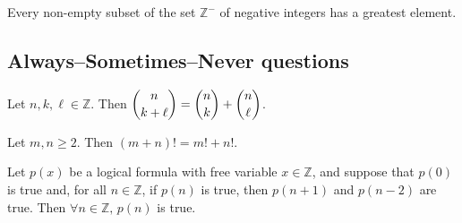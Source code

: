 \begin{chapex} %
\label{cqInductionTFEnd}
Every non-empty subset of the set $\mathbb{Z}^{-}$ of negative integers has a greatest element.
\end{chapex}

\subsection*{Always--Sometimes--Never questions}


\begin{chapex} %
\label{cqInductionASNBegin}
Let $n,k,\ell \in \mathbb{Z}$. Then $\dbinom{n}{k+\ell} = \dbinom{n}{k} + \dbinom{n}{\ell}$.
\end{chapex}

\begin{chapex} %
Let $m,n \ge 2$. Then $(m+n)! = m!+n!$.
\end{chapex}

\begin{chapex} %
\label{cqInductionASNEnd}
Let $p(x)$ be a logical formula with free variable $x \in \mathbb{Z}$, and suppose that $p(0)$ is true and, for all $n \in \mathbb{Z}$, if $p(n)$ is true, then $p(n+1)$ and $p(n-2)$ are true. Then $\forall n \in \mathbb{Z},\, p(n)$ is true.
\end{chapex}